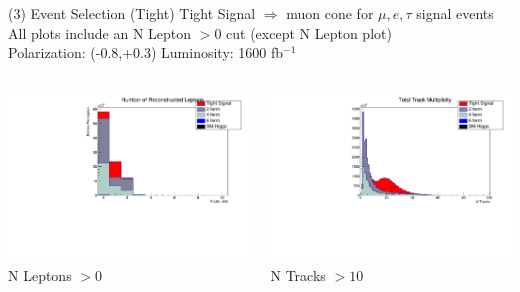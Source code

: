 \documentclass[10pt]{beamer}
\begin{document}
\begin{frame}{(3) Event Selection (Tight)}
\scriptsize
Tight Signal $\Rightarrow$  muon cone for $\mu,e,\tau$ signal events\\
All plots include an N Lepton $> 0$ cut (except N Lepton plot)\\
Polarization: (-0.8,+0.3)\quad
Luminosity: 1600 fb$^{-1}$
\begin{columns}
\begin{column}{0.5\textwidth}
\includegraphics[scale=0.3, left]{nLepHist.pdf} \\
N Leptons $> 0$
\end{column}
\begin{column}{0.5\textwidth}
\includegraphics[scale=0.3, left]{ntracksHist.pdf} \\
N Tracks $> 10$
\end{column}
\end{columns}
\end{frame}
\end{document}
